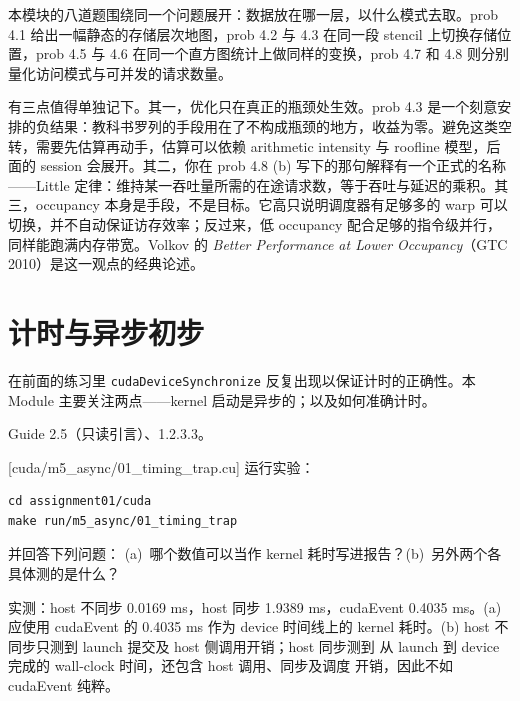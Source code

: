 \documentclass[11pt,a4paper,fontset=fandol]{ctexart}
\begin{document}
\begin{lookback}
本模块的八道题围绕同一个问题展开：数据放在哪一层，以什么模式去取。prob 4.1 给出一幅静态的存储层次地图，prob 4.2 与 4.3 在同一段 stencil 上切换存储位置，prob 4.5 与 4.6 在同一个直方图统计上做同样的变换，prob 4.7 和 4.8 则分别量化访问模式与可并发的请求数量。

有三点值得单独记下。其一，优化只在真正的瓶颈处生效。prob 4.3 是一个刻意安排的负结果：教科书罗列的手段用在了不构成瓶颈的地方，收益为零。避免这类空转，需要先估算再动手，估算可以依赖 arithmetic intensity 与 roofline 模型，后面的 session 会展开。其二，你在 prob 4.8 (b) 写下的那句解释有一个正式的名称——Little 定律：维持某一吞吐量所需的在途请求数，等于吞吐与延迟的乘积。其三，occupancy 本身是手段，不是目标。它高只说明调度器有足够多的 warp 可以切换，并不自动保证访存效率；反过来，低 occupancy 配合足够的指令级并行，同样能跑满内存带宽。Volkov 的 \textit{Better Performance at Lower Occupancy}（GTC 2010）是这一观点的经典论述。
\end{lookback}

\section{计时与异步初步}

在前面的练习里 \texttt{cudaDeviceSynchronize} 反复出现以保证计时的正确性。本 Module 主要关注两点——kernel 启动是异步的；以及如何准确计时。

\begin{reading}
Guide 2.5（只读引言）、1.2.3.3。
\end{reading}

[cuda/m5\_async/01\_timing\_trap.cu]
运行实验：

\begin{lstlisting}
cd assignment01/cuda
make run/m5_async/01_timing_trap
\end{lstlisting}

并回答下列问题：
(a)~哪个数值可以当作 kernel 耗时写进报告？(b)~另外两个各具体测的是什么？

\begin{answer}
实测：host 不同步 0.0169 ms，host 同步 1.9389 ms，cudaEvent
0.4035 ms。(a) 应使用 cudaEvent 的 0.4035 ms 作为 device 时间线上的 kernel
耗时。(b) host 不同步只测到 launch 提交及 host 侧调用开销；host 同步测到
从 launch 到 device 完成的 wall-clock 时间，还包含 host 调用、同步及调度
开销，因此不如 cudaEvent 纯粹。
\end{answer}
\end{document}
